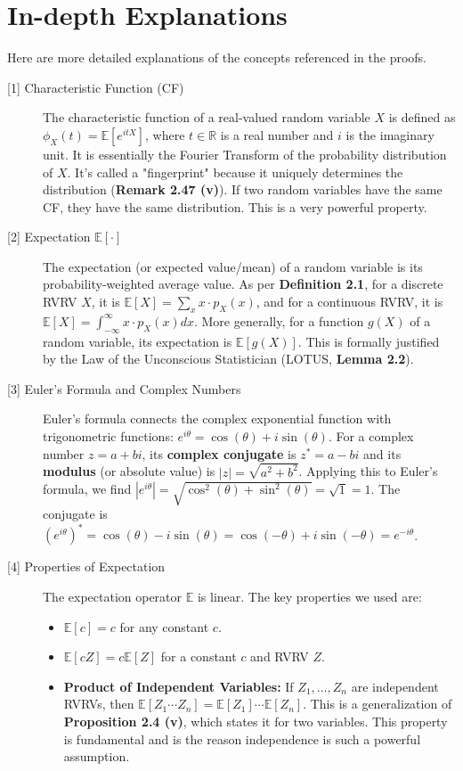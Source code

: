 \documentclass[11pt,a4paper]{article}
\begin{document}
\newpage
\section{In-depth Explanations}
Here are more detailed explanations of the concepts referenced in the proofs.

\begin{description}
    \item[\hypertarget{note1}{[1] Characteristic Function (CF)}] The characteristic function of a real-valued random variable $X$ is defined as $\phi_X(t) = \mathbb{E}[e^{itX}]$, where $t \in \mathbb{R}$ is a real number and $i$ is the imaginary unit. It is essentially the Fourier Transform of the probability distribution of $X$. It's called a "fingerprint" because it uniquely determines the distribution (\textbf{Remark 2.47 (v)}). If two random variables have the same CF, they have the same distribution. This is a very powerful property.

    \item[\hypertarget{note2}{[2] Expectation $\mathbb{E}[\cdot]$}] The expectation (or expected value/mean) of a random variable is its probability-weighted average value. As per \textbf{Definition 2.1}, for a discrete RVRV $X$, it is $\mathbb{E}[X] = \sum_x x \cdot p_X(x)$, and for a continuous RVRV, it is $\mathbb{E}[X] = \int_{-\infty}^{\infty} x \cdot p_X(x) dx$. More generally, for a function $g(X)$ of a random variable, its expectation is $\mathbb{E}[g(X)]$. This is formally justified by the Law of the Unconscious Statistician (LOTUS, \textbf{Lemma 2.2}).

    \item[\hypertarget{note3}{[3] Euler's Formula and Complex Numbers}] Euler's formula connects the complex exponential function with trigonometric functions: $e^{i\theta} = \cos(\theta) + i\sin(\theta)$. For a complex number $z = a+bi$, its \textbf{complex conjugate} is $z^* = a-bi$ and its \textbf{modulus} (or absolute value) is $|z| = \sqrt{a^2+b^2}$. Applying this to Euler's formula, we find $|e^{i\theta}| = \sqrt{\cos^2(\theta) + \sin^2(\theta)} = \sqrt{1} = 1$. The conjugate is $(e^{i\theta})^* = \cos(\theta) - i\sin(\theta) = \cos(-\theta) + i\sin(-\theta) = e^{-i\theta}$.

    \item[\hypertarget{note4}{[4] Properties of Expectation}] The expectation operator $\mathbb{E}$ is linear. The key properties we used are:
    \begin{itemize}
        \item $\mathbb{E}[c] = c$ for any constant $c$.
        \item $\mathbb{E}[cZ] = c\mathbb{E}[Z]$ for a constant $c$ and RVRV $Z$.
        \item \textbf{Product of Independent Variables:} If $Z_1, \ldots, Z_n$ are independent RVRVs, then $\mathbb{E}[Z_1 \cdots Z_n] = \mathbb{E}[Z_1] \cdots \mathbb{E}[Z_n]$. This is a generalization of \textbf{Proposition 2.4 (v)}, which states it for two variables. This property is fundamental and is the reason independence is such a powerful assumption.
    \end{itemize}


\end{description}
\end{document}
